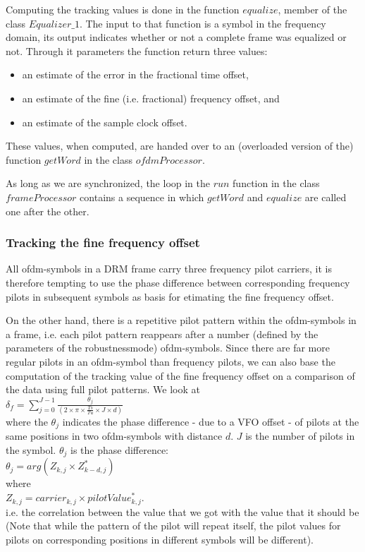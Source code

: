 \documentclass[11pt]{article}
\begin{document}
Computing the tracking values is done in the function $equalize$, member
of the class $Equalizer\_1$. The input to that function is a symbol
in the frequency domain, its output indicates whether or not a complete
frame was equalized or not.
Through it parameters  the function return three values:
\begin{itemize}
\item an estimate of the error in the fractional time offset,
\item an estimate of the fine (i.e. fractional) frequency offset, and
\item an estimate of the sample clock offset.
\end{itemize}
These values, when computed, are handed over to an (overloaded
version of the) function $getWord$ in the class $ofdmProcessor$.

As long as we are synchronized, the loop in the $run$ function in the
class $frameProcessor$ contains a sequence in which
$getWord$ and $equalize$ are called one after the other.
\subsubsection{Tracking the fine frequency offset}
All ofdm-symbols in a DRM frame carry three frequency pilot carriers,
it is therefore
tempting to use the phase difference between corresponding
frequency pilots in subsequent
symbols as basis for etimating the fine frequency offset. 

On the other hand, there is a repetitive pilot pattern within the ofdm-symbols
in a frame, i.e. each
pilot pattern reappears after a number (defined by the parameters of the
robustnessmode) ofdm-symbols. Since there are far more regular pilots
in an ofdm-symbol than frequency pilots, we can also base the
computation of the tracking value of the fine frequency offset 
on  a comparison of the data using full pilot patterns.
We look at 
{
\ \\
$\delta_f = \sum_{j=0}^{J - 1}\frac{\theta_j}{(2 \times \pi \times \frac{Ts}{Tu} \times J \times d)}$
\ \\
}
where the $\theta_j$ indicates the phase difference - due to a VFO offset -
of pilots at the same positions in two ofdm-symbols with distance $d$. $J$ is
the number of pilots in the symbol. $\theta_j$ is the phase difference:
{
\ \\
$\theta_j = arg (Z_{k, j} \times Z_{k - d, j}^*)$
\ \\
}
where
{
\ \\
$Z_{k, j} = carrier_{k, j} \times pilotValue_{k, j}^*$.
\ \\
}
i.e. the correlation between the value that we got with the value
that it should be (Note that while the pattern of the pilot will repeat
itself, the pilot values for pilots on corresponding positions
in different symbols will be different).
\end{document}
